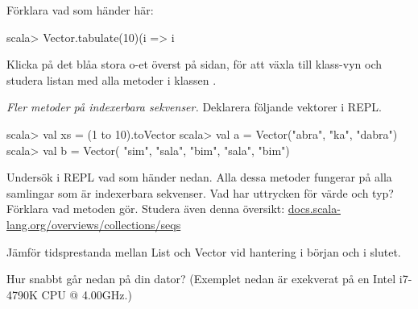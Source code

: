 {{\Subtask Förklara vad som händer här:
\begin{REPLnonum}
scala> Vector.tabulate(10)(i => i %
\end{REPLnonum}

\Subtask Klicka på det blåa stora o-et överst på sidan, för att växla till klass-vyn och studera listan med alla metoder  i klassen . 


\Task \emph{Fler metoder på indexerbara sekvenser.} Deklarera följande vektorer i REPL. 
\begin{REPL}
scala> val xs = (1 to 10).toVector
scala> val a = Vector("abra", "ka", "dabra")
scala> val b = Vector( "sim", "sala", "bim", "sala", "bim")
\end{REPL}
Undersök i REPL vad som händer nedan. Alla dessa metoder fungerar på alla samlingar som är indexerbara sekvenser. Vad har uttrycken för värde och typ? Förklara vad metoden gör. Studera även denna  översikt: \href{http://docs.scala-lang.org/overviews/collections/seqs}{docs.scala-lang.org/overviews/collections/seqs}

\Subtask {}  %

\Subtask {}  %

\Subtask {} %

\Subtask {} %

\Subtask {}  %

\Subtask {} %

\Subtask {}	%

\Subtask {} %

\Subtask {} %

\Subtask {} %



\Task Jämför tidsprestanda mellan List och Vector vid hantering i början och i slutet. 

\Subtask Hur snabbt går nedan på din dator? (Exemplet nedan är exekverat på en Intel i7-4790K CPU @ 4.00GHz.) %

}}
